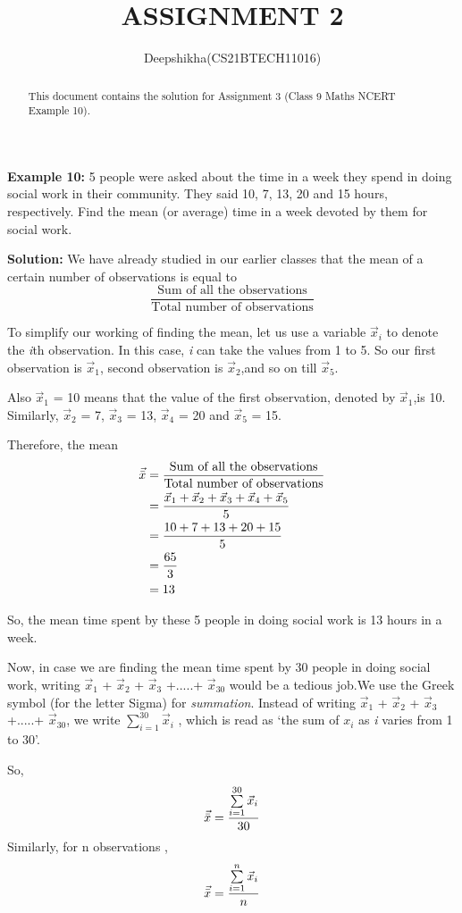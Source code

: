\documentclass[journal, 12pt, twocolumn]{IEEEtran}
\begin{document}
\title{ASSIGNMENT 2}
\author{Deepshikha(CS21BTECH11016)}
\maketitle

\begin{abstract}
This document contains the solution for Assignment 3 (Class 9 Maths NCERT Example 10).
\end{abstract}

\textbf{Example 10:}
5 people were asked about the time in a week they spend in doing
social work in their community. They said 10, 7, 13, 20 and 15 hours, respectively.
Find the mean (or average) time in a week devoted by them for social work.

\textbf{Solution:}
We have already studied in our earlier classes that the mean of a certain
number of observations is equal to\[\frac{\text{Sum of all the observations}}{\text{Total number of observations}}\]

To simplify our working of finding the mean, let us use a variable $\vec{x}_i$
to denote the \emph{i}th observation. In
this case, \emph{i} can take the values from 1 to 5. So our first observation is $\vec{x}_1$, second
observation is $\vec{x}_2$,and so on till $\vec{x}_5$.

Also $\vec{x}_1$ = 10 means that the value of the first observation, denoted by $\vec{x}_1$,is 10.
Similarly, $\vec{x}_2$ = 7, $\vec{x}_3$ = 13, $\vec{x}_4$ = 20 and $\vec{x}_5$ = 15.

Therefore, the mean 
\begin{align}
\vec{\Bar{x}}&=\frac{\text{Sum of all the observations}}{\text{Total number of observations}}\\
    &=\frac{\vec{x}_1 + \vec{x}_2 + \vec{x}_3 + \vec{x}_4 + \vec{x}_5}{5}\\
    &=\frac{10 + 7 + 13 + 20 + 15}{5}\\
    &=\frac{65}{3}\\
    &=13
\end{align}

So, the mean time spent by these 5 people in doing social work is 13 hours in a week.


Now, in case we are finding the mean time spent by 30 people in doing social
work, writing $\vec{x}_1$ + $\vec{x}_2$ + $\vec{x}_3$ +.....+ $\vec{x}_{30}$ would be a tedious job.We use the Greek symbol \textSigma (for the letter Sigma) for \emph{summation}.
Instead of writing $\vec{x}_1$ + $\vec{x}_2$ + $\vec{x}_3$ +.....+ $\vec{x}_{30}$, 
we write $\sum\limits_{i=1}^{30} \vec{x}_i $ , which is read as ‘the sum of $x_i$ as \emph{i} varies from 1 to 30’.


So,
\begin{equation}
    \vec{\Bar{x}}=\frac{\sum\limits_{i=1}^{30} \vec{x}_i}{30}\label{eq:6}
\end{equation}
Similarly, for n observations ,
\begin{equation}
    \vec{\Bar{x}}=\frac{\sum\limits_{i=1}^{n} \vec{x}_i}{n}
\end{equation}
\end{document}
